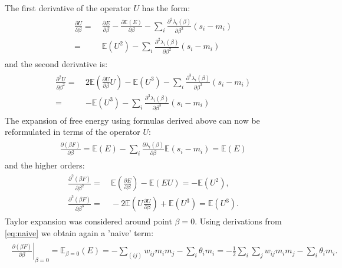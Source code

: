 The first derivative of the operator $U$ has the form:
\begin{align}
\begin{split}
\frac{\partial U}{\partial \beta}  =  ~&\frac{\partial E}{\partial \beta} - \frac{\partial \mathbb{E}(E)}{\partial \beta} - \sum_i \frac{\partial^2 \lambda_i (\beta)}{\partial \beta^2} (s_i - m_i)\\
= ~& \mathbb{E}(U^2) - \sum_i \frac{\partial^2 \lambda_i (\beta)}{\partial \beta^2} (s_i - m_i)
\end{split}
\end{align}
and the second derivative is:
\begin{align}
\begin{split}
\frac{\partial^2 U}{\partial \beta^2}  =  ~& 2 \mathbb{E}\left(\frac{\partial U}{\partial \beta}U  \right) - \mathbb{E}(U^3) - \sum_i \frac{\partial^3 \lambda_i (\beta)}{\partial \beta^3} (s_i - m_i) \\
= ~& - \mathbb{E}(U^3) - \sum_i \frac{\partial^3 \lambda_i (\beta)}{\partial \beta^3} (s_i - m_i)
\end{split}
\end{align}
The expansion of free energy using formulas derived above can now be reformulated in terms of the operator $U$:
\begin{align}
\begin{split}
 \frac{\partial (\beta F)}{\partial \beta} = \mathbb{E}(E) - \sum_i \frac{\partial\lambda_i (\beta)}{\partial \beta}\mathbb{E}(s_i - m_i) = \mathbb{E}(E) 
\end{split}
\label{eq:naive}
\end{align}
and the higher orders:
\begin{align}
\begin{split}
 \frac{\partial^2 (\beta F)}{\partial \beta^2} = &~ \mathbb{E}\left( \frac{\partial E}{\partial \beta} \right) - \mathbb{E}(EU) = - \mathbb{E}(U^2),\\
 \frac{\partial^3 (\beta F)}{\partial \beta^3}= &~ - 2\mathbb{E}\left( U \frac{\partial U}{\partial \beta} \right) + \mathbb{E}(U^3)  = \mathbb{E}(U^3).
  \label{eq:higherOrders}
\end{split}
\end{align}
Taylor expansion was considered around point $\beta =0$. Using derivations from \ref{eq:naive} we obtain again a 'naive' term:
\begin{align}
\begin{split}
\left. \frac{\partial (\beta F)}{\partial \beta} \right|_{\beta =0} = \mathbb{E} _{\beta = 0}(E) = - \sum_{(ij)} w_{ij} m_i m_j - \sum_i \theta_i m_i = - \frac{1}{2} \sum_i \sum_j w_{ij}m_i m_j - \sum_i \theta_i m_i.
\end{split}
\end{align}
